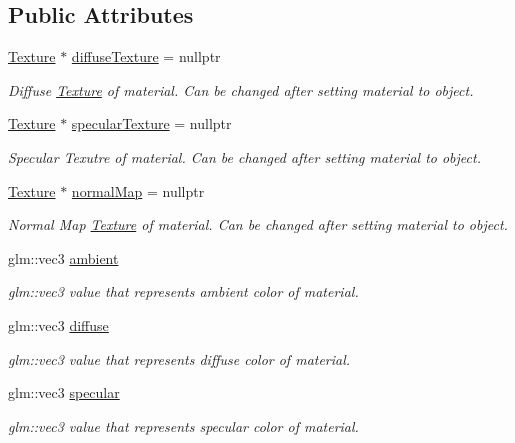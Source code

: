 \subsection*{Public Attributes}
\begin{DoxyCompactItemize}
\item 
\mbox{\hyperlink{class_texture}{Texture}} $\ast$ \mbox{\hyperlink{struct_material_a187af0c557b8521fa0a88507ae618c42}{diffuse\+Texture}} = nullptr
\begin{DoxyCompactList}\small\item\em Diffuse \mbox{\hyperlink{class_texture}{Texture}} of material. Can be changed after setting material to object. \end{DoxyCompactList}\item 
\mbox{\hyperlink{class_texture}{Texture}} $\ast$ \mbox{\hyperlink{struct_material_a1ca33d2644100f269b8289ddd08dd6e4}{specular\+Texture}} = nullptr
\begin{DoxyCompactList}\small\item\em Specular Texutre of material. Can be changed after setting material to object. \end{DoxyCompactList}\item 
\mbox{\hyperlink{class_texture}{Texture}} $\ast$ \mbox{\hyperlink{struct_material_a915ba1f28243cdd67be5ccc70d4073d8}{normal\+Map}} = nullptr
\begin{DoxyCompactList}\small\item\em Normal Map \mbox{\hyperlink{class_texture}{Texture}} of material. Can be changed after setting material to object. \end{DoxyCompactList}\item 
glm\+::vec3 \mbox{\hyperlink{struct_material_af99c823542e497c98a35d1aac5fc9012}{ambient}}
\begin{DoxyCompactList}\small\item\em glm\+::vec3 value that represents ambient color of material. \end{DoxyCompactList}\item 
glm\+::vec3 \mbox{\hyperlink{struct_material_a099904e2f5a7bbec3cba6bf8ec546b11}{diffuse}}
\begin{DoxyCompactList}\small\item\em glm\+::vec3 value that represents diffuse color of material. \end{DoxyCompactList}\item 
glm\+::vec3 \mbox{\hyperlink{struct_material_aac1c499923ff99564cdd97a4b5e504a9}{specular}}
\begin{DoxyCompactList}\small\item\em glm\+::vec3 value that represents specular color of material. \end{DoxyCompactList}\item 

\end{DoxyCompactItemize}
